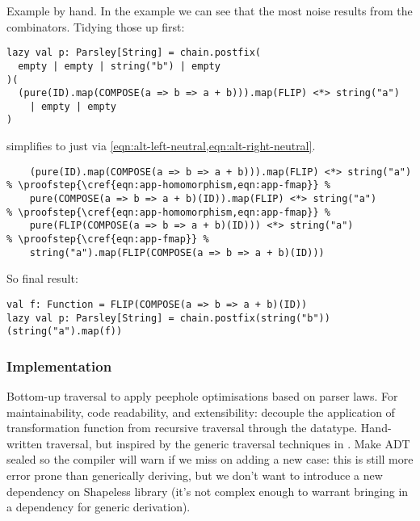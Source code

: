 \documentclass[../../main.tex]{subfiles}
\begin{document}
Example by hand.
In the example we can see that the most noise results from the  combinators. %
Tidying those up first:
\begin{verbatim}
lazy val p: Parsley[String] = chain.postfix(
  empty | empty | string("b") | empty
)(
  (pure(ID).map(COMPOSE(a => b => a + b))).map(FLIP) <*> string("a")
    | empty | empty
)
\end{verbatim}
%
 simplifies to just  via \cref{eqn:alt-left-neutral,eqn:alt-right-neutral}.
\begin{verbatim}
    (pure(ID).map(COMPOSE(a => b => a + b))).map(FLIP) <*> string("a")
% \proofstep{\cref{eqn:app-homomorphism,eqn:app-fmap}} %
    pure(COMPOSE(a => b => a + b)(ID)).map(FLIP) <*> string("a")
% \proofstep{\cref{eqn:app-homomorphism,eqn:app-fmap}} %
    pure(FLIP(COMPOSE(a => b => a + b)(ID))) <*> string("a")
% \proofstep{\cref{eqn:app-fmap}} %
    string("a").map(FLIP(COMPOSE(a => b => a + b)(ID)))
\end{verbatim}
So final result:
\begin{verbatim}
val f: Function = FLIP(COMPOSE(a => b => a + b)(ID))
lazy val p: Parsley[String] = chain.postfix(string("b"))(string("a").map(f))
\end{verbatim}

\subsubsection{Implementation}
Bottom-up traversal to apply peephole optimisations based on parser laws.
For maintainability, code readability, and extensibility: decouple the application of transformation function from recursive traversal through the datatype.
Hand-written traversal, but inspired by the generic traversal techniques in \cite{mitchell_uniform_2007}.
Make ADT sealed so the compiler will warn if we miss on adding a new case: this is still more error prone than generically deriving, but we don't want to introduce a new dependency on Shapeless library (it's not complex enough to warrant bringing in a dependency for generic derivation).
\end{document}
